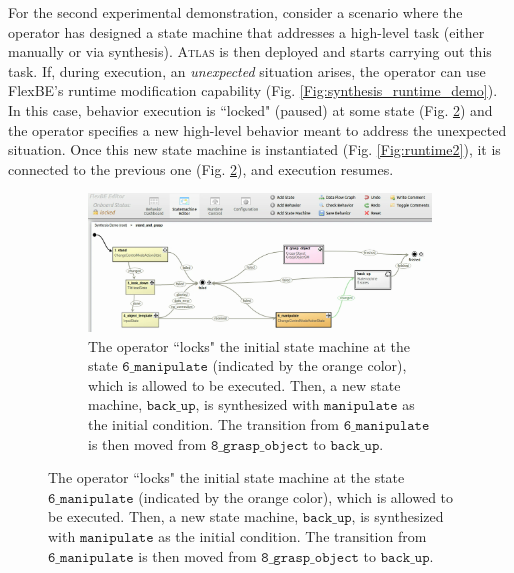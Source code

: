 For the second experimental demonstration, consider a scenario where the operator has designed a state machine that addresses a high-level task (either manually or via synthesis).
\textsc{Atlas} is then deployed and starts carrying out this task.
If, during execution, an \emph{unexpected} situation arises, the operator can use FlexBE's runtime modification capability (Fig. \ref{Fig:synthesis_runtime_demo}).
In this case, behavior execution is ``locked" (paused) at some state (Fig. \ref{Fig:runtime1}) and the operator specifies a new high-level behavior meant to address the unexpected situation.
Once this new state machine is instantiated (Fig. \ref{Fig:runtime2}), it is connected to the previous one (Fig. \ref{Fig:runtime1}), and execution resumes.

\begin{figure}[t]
	\centering
	\begin{subfigure}[b]{0.99\columnwidth}
	\includegraphics[width=0.99\columnwidth, clip]{./img/synthesis_runtime_connect_sm.png}
	\caption{The operator ``locks" the initial state machine at the state $\mathtt{6\_manipulate}$ (indicated by the orange color), which is allowed to be executed.
	Then, a new state machine, $\mathtt{back\_up}$, is synthesized with $\mathtt{manipulate}$ as the initial condition.
	The transition from $\mathtt{6\_manipulate}$ is then moved from $\mathtt{8\_grasp\_object}$ to $\mathtt{back\_up}$.
	} 
	\label{Fig:runtime1}
	\end{subfigure}
	

\end{figure}
